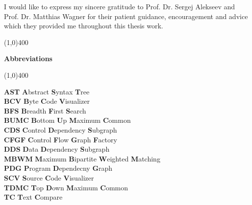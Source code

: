 \documentclass{report}
\newcommand{\Hline}{\par
  \begin{center}
   \line(1,0){400}
   \end{center}
}
\begin{document}
\noindent I would like to express my sincere gratitude to Prof. Dr. Sergej Alekseev and Prof. Dr. Matthias Wagner for their patient guidance, encouragement and advice which they provided me throughout this thesis work.


\newpage
\tableofcontents
\listoffigures
\listoftables

\newpage
{}
\Hline
\begin{center}{\huge\bf Abbreviations\par}\end{center}
\Hline
\vspace{10mm}
\null

\noindent
\textbf{AST} \hspace{24.5 mm}  \textbf{A}bstract \textbf{S}yntax \textbf{T}ree \\
\textbf{BCV} \hspace{23.7 mm}  \textbf{B}yte \textbf{C}ode \textbf{V}isualizer \\
\textbf{BFS} \hspace{25 mm}  \textbf{B}readth \textbf{F}irst \textbf{S}earch \\
\textbf{BUMC} \hspace{19.5 mm} \textbf{B}ottom \textbf{U}p \textbf{M}aximum \textbf{C}ommon \\
\textbf{CDS} \hspace{24 mm}  \textbf{C}ontrol \textbf{D}ependency \textbf{S}ubgraph \\
\textbf{CFGF} \hspace{21.1 mm} \textbf{C}ontrol \textbf{F}low \textbf{G}raph  \textbf{F}actory \\
\textbf{DDS} \hspace{23.8 mm}  \textbf{D}ata \textbf{D}ependency \textbf{S}ubgraph \\
\textbf{MBWM} \hspace{17.5 mm} \textbf{M}aximum \textbf{B}ipartite \textbf{W}eighted \textbf{M}atching \\
\textbf{PDG} \hspace{23.1 mm}  \textbf{P}rogram \textbf{D}ependecny \textbf{G}raph \\
\textbf{SCV} \hspace{24 mm}  \textbf{S}ource \textbf{C}ode \textbf{V}isualizer \\
\textbf{TDMC} \hspace{19.5 mm} \textbf{T}op \textbf{D}own \textbf{M}aximum \textbf{C}ommon \\
\textbf{TC} \hspace{26.5 mm}   \textbf{T}ext \textbf{C}ompare \\
\end{document}
